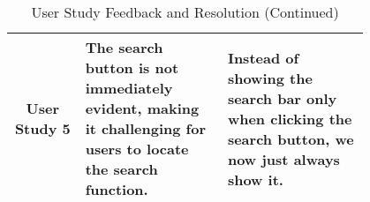 \begin{table*}

    \centering
    \small %
    \setlength{\extrarowheight}{5pt} %
    \renewcommand{\arraystretch}{1.5} %
    \begin{tabular}{|c|p{0.4\linewidth}|p{0.4\linewidth}|}
        \hline
        User Study 5 & The search button is not immediately evident, making it challenging for users to locate the search function. & 
        Instead of showing the search bar only when clicking the search button, we now just always show it. \\
        \hline

    \end{tabular}
    \caption{User Study Feedback and Resolution (Continued)} \label{tab:user_study5}

\end{table*}



